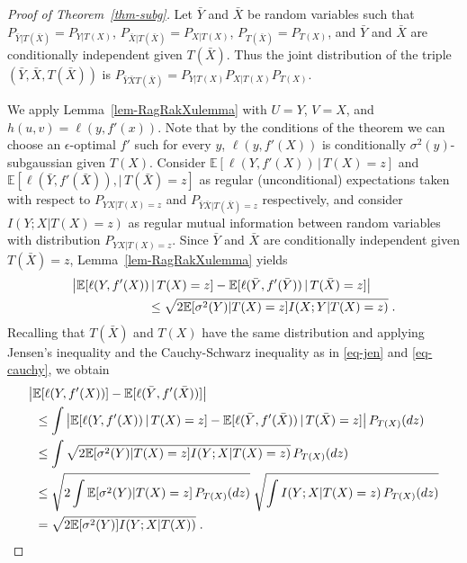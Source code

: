 \documentclass[11pt]{article}
\def\EXP {{\mathbb E}}
\begin{document}
\begin{proof}[Proof of Theorem~\ref{thm-subg}]  
Let $\bar{Y}$ and $\bar{X}$  be random variables such that $P_{\bar{Y}|T(\bar{X})}=P_{Y|T(X)}$,  $P_{\bar{X}|T(\bar{X})} =P_{X|T(X)}$,  $P_{T(\bar{X})}= P_{T(X)}$, and $\bar{Y}$ and $\bar{X}$ are conditionally independent given $T(\bar{X})$. 
Thus the joint distribution of the triple $(\bar{Y},\bar{X},T(\bar{X}))$ is  $P_{\bar{Y}\bar{X}T(\bar{X})}= P_{Y|T(X)}P_{X|T(X)}P_{T(X)}$.

 We apply Lemma~\ref{lem-RagRakXulemma} with $U=Y$, $V=X$, and
 $h(u,v)=\ell(y,f'(x))$. Note that by the conditions of the theorem we
 can choose an  $\epsilon$-optimal $f'$ such for every  $y$,
 $\ell(y,f'(X))$ is conditionally  $\sigma^2(y)$-subgaussian given $T(X)$. Consider $\EXP [\ell(Y,f'(X))\,|\, T(X)=z]$ and $\EXP[\ell(\bar{Y},f'(\bar{X})) ,|\, T(\bar{X})=z]$ as regular (unconditional) expectations taken with respect to $P_{YX|T(X)=z}$ and 
$P_{\bar{Y}\bar{X}|T(\bar{X})=z}$ respectively,    and consider $I(Y;X|T(X)=z)$  as regular mutual information between random variables with distribution $P_{YX|T(X)=z}$.  Since   $\bar{Y}$ and $\bar{X}$ are conditionally independent  given
$T(\bar{X})=z$,  Lemma~\ref{lem-RagRakXulemma}  yields 
\begin{align*}
\MoveEqLeft[6]  \big| \EXP [\ell(Y,f'(X))\,|\, T(X)=z]  - \EXP [\ell(\bar{Y},f'(\bar{Y})) \,|\, T(\bar{X})=z] \big|\nonumber \\  
&\le \sqrt{2\EXP[\sigma^2(Y)|T(X)=z] I(X;Y|T(X)=z)}\;.
\end{align*}
Recalling that $T(\bar{X})$ and $T(X)$ have the same distribution and applying Jensen's inequality and the Cauchy-Schwarz inequality as in \eqref{eq-jen} and \eqref{eq-cauchy}, we obtain 
\begin{align}  
 \MoveEqLeft[0.5] \big| \EXP [\ell(Y,f'(X))]  - \EXP [\ell(\bar{Y},f'(\bar{X})) ] \big| 
\nonumber \\
& \le \int \big| \EXP [\ell(Y,f'(X))\,|\, T(X)=z]  - \EXP [\ell(\bar{Y},f'(\bar{X})) \,|\, T(\bar{X})=z] \big| \, P_{T(X)}(dz) \nonumber \\
&\le \int \sqrt{2\EXP[\sigma^2(Y)|T(X)=z] I(Y;X|T(X)=z)}  \, P_{T(X)}(dz) 
\nonumber \\
&\le 
 \sqrt{2\int \EXP[\sigma^2(Y)|T(X)=z]  \,P_{T(X)}(dz) } \; \sqrt{ \int I(Y;X|T(X)=z) \,P_{T(X)}(dz)}   \nonumber  \\
 & = \sqrt{2\EXP[\sigma^2(Y)]  I(Y;X|T(X))}\;. \label{eq3}  
\end{align}  



\end{proof}
\end{document}
